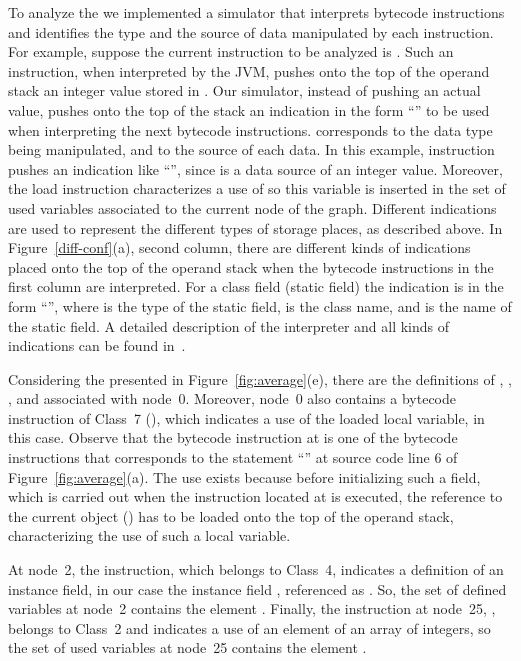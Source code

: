 To analyze the \IG we implemented a simulator that interprets
bytecode instructions and identifies the type and the source of
data manipulated by each instruction. For example, suppose the
current instruction to be analyzed is . Such an
instruction, when interpreted by the JVM, pushes onto the top of
the operand stack an integer value stored in . Our
simulator, instead of pushing an actual value, pushes onto the top
of the stack an indication in the form ``'' to be used when interpreting the next
bytecode instructions.  corresponds to the data
type being manipulated, and  to the source
of each data. In this example, instruction  pushes
an indication like ``'', since  is a data
source of an integer value. Moreover, the load instruction
characterizes a use of  so this variable is inserted in
the set of used variables associated to the current node of the
\IG graph. Different indications are used to represent the
different types of storage places, as described above. In
Figure~\ref{diff-conf}(a), second column, there are different
kinds of indications placed onto the top of the operand stack when
the bytecode instructions in the first column are interpreted. For
a class field (static field) the indication is in the form
``'', where
 is the type of the static field,
 is the class name, and
 is the name of the static field. A detailed
description of the interpreter and all kinds of indications can be
found in~\cite{Vincenzi03STOO}.

Considering the \IG presented in Figure~\ref{fig:average}(e),
there are the definitions of , , ,
and  associated with node~0. Moreover, node~0 also
contains a bytecode instruction of Class~7 (), which
indicates a use of the loaded local variable,  in this
case. Observe that the bytecode instruction at  is one of the
bytecode instructions that corresponds to the statement ``'' at source code line 6 of Figure~\ref{fig:average}(a). The
use exists because before initializing such a field, which is
carried out when the instruction located at  is executed, the
reference to the current object () has to be loaded onto
the top of the operand stack, characterizing the use of such a
local variable.

At node~2, the  instruction, which belongs to
Class~4, indicates a definition of an instance field, in our case
the instance field , referenced as . So, the set
of defined variables at node~2 contains the element .
Finally, the instruction at node~25, , belongs to
Class~2 and indicates a use of an element of an array of integers,
so the set of used variables at node~25 contains the element
.

